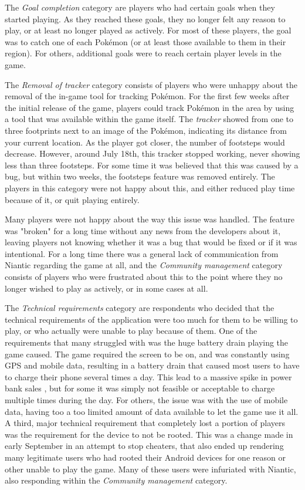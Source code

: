 The \emph{Goal completion} category are players who had certain goals when they started playing. As they reached these goals, they no longer felt any reason to play, or at least no longer played as actively. For most of these players, the goal was to catch one of each Pokémon (or at least those available to them in their region). For others, additional goals were to reach certain player levels in the game.

The \emph{Removal of tracker} category consists of players who were unhappy about the removal of the in-game tool for tracking Pokémon. For the first few weeks after the initial release of the game, players could track Pokémon in the area by using a tool that was available within the game itself. The \emph{tracker} showed from one to three footprints next to an image of the Pokémon, indicating its distance from your current location. As the player got closer, the number of footsteps would decrease. However, around July 18th, this tracker stopped working, never showing less than three footsteps. For some time it was believed that this was caused by a bug, but within two weeks, the footsteps feature was removed entirely. The players in this category were not happy about this, and either reduced play time because of it, or quit playing entirely.

Many players were not happy about the way this issue was handled. The feature was "broken" for a long time without any news from the developers about it, leaving players not knowing whether it was a bug that would be fixed or if it was intentional. For a long time there was a general lack of communication from Niantic regarding the game at all, and the \emph{Community management} category consists of players who were frustrated about this to the point where they no longer wished to play as actively, or in some cases at all.

The \emph{Technical requirements} category are respondents who decided that the technical requirements of the application were too much for them to be willing to play, or who actually were unable to play because of them. One of the requirements that many struggled with was the huge battery drain playing the game caused. The game required the screen to be on, and was constantly using GPS and mobile data, resulting in a battery drain that caused most users to have to charge their phone several times a day. This lead to a massive spike in power bank sales , but for some it was simply not feasible or acceptable to charge multiple times during the day. For others, the issue was with the use of mobile data, having too a too limited amount of data available to let the game use it all. A third, major technical requirement that completely lost a portion of players was the requirement for the device to not be rooted. This was a change made in early September in an attempt to stop cheaters, that also ended up rendering many legitimate users who had rooted their Android devices for one reason or other unable to play the game. Many of these users were infuriated with Niantic, also responding within the \emph{Community management} category.


